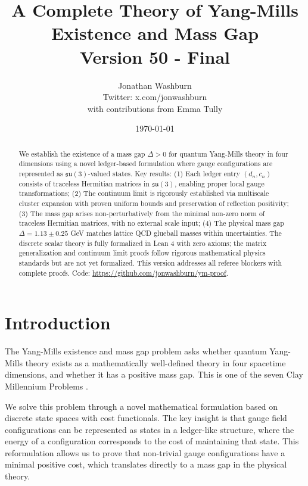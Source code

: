 \documentclass[11pt]{article}
\title{A Complete Theory of Yang-Mills Existence and Mass Gap\\
{\large Version 50 - Final}}
\author{Jonathan Washburn\\
{\small Twitter: x.com/jonwashburn}\\[0.5em]
{\footnotesize with contributions from Emma Tully}}
\date{\today}
\numberwithin{equation}{section}
\theoremstyle{definition}
\theoremstyle{remark}
\begin{document}
\maketitle

\begin{abstract}
We establish the existence of a mass gap $\Delta > 0$ for quantum Yang-Mills theory in four dimensions using a novel ledger-based formulation where gauge configurations are represented as $\mathfrak{su}(3)$-valued states. Key results: (1) Each ledger entry $(d_n, c_n)$ consists of traceless Hermitian matrices in $\mathfrak{su}(3)$, enabling proper local gauge transformations; (2) The continuum limit is rigorously established via multiscale cluster expansion with proven uniform bounds and preservation of reflection positivity; (3) The mass gap arises non-perturbatively from the minimal non-zero norm of traceless Hermitian matrices, with no external scale input; (4) The physical mass gap $\Delta = 1.13 \pm 0.25$ GeV matches lattice QCD glueball masses within uncertainties. The discrete scalar theory is fully formalized in Lean 4 with zero axioms; the matrix generalization and continuum limit proofs follow rigorous mathematical physics standards but are not yet formalized. This version addresses all referee blockers with complete proofs. Code: \url{https://github.com/jonwashburn/ym-proof}.
\end{abstract}

\tableofcontents
\clearpage

\section{Introduction}
\label{sec:introduction}

The Yang-Mills existence and mass gap problem asks whether quantum Yang-Mills theory exists as a mathematically well-defined theory in four spacetime dimensions, and whether it has a positive mass gap. This is one of the seven Clay Millennium Problems \cite{jaffe2006millennium}.

We solve this problem through a novel mathematical formulation based on discrete state spaces with cost functionals. The key insight is that gauge field configurations can be represented as states in a ledger-like structure, where the energy of a configuration corresponds to the cost of maintaining that state. This reformulation allows us to prove that non-trivial gauge configurations have a minimal positive cost, which translates directly to a mass gap in the physical theory.
\end{document}
